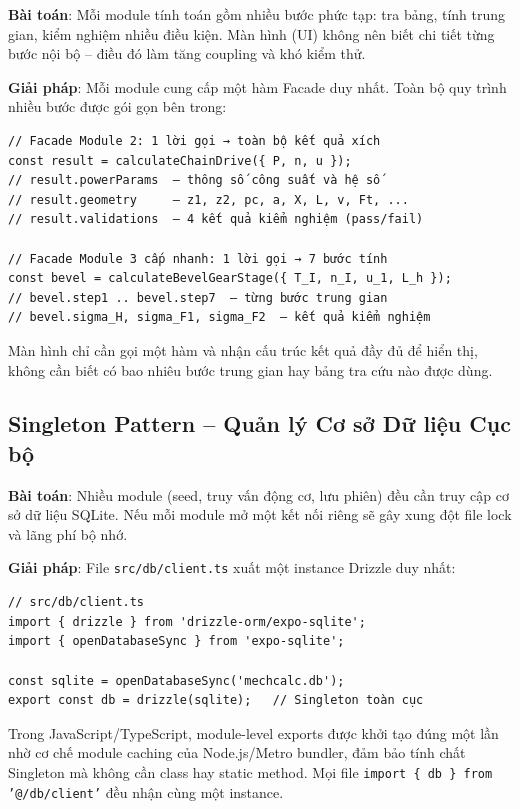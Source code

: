\textbf{Bài toán}: Mỗi module tính toán gồm nhiều bước phức tạp:
tra bảng, tính trung gian, kiểm nghiệm nhiều điều kiện.
Màn hình (UI) không nên biết chi tiết từng bước nội bộ
-- điều đó làm tăng coupling và khó kiểm thử.

\textbf{Giải pháp}: Mỗi module cung cấp một hàm Facade duy nhất.
Toàn bộ quy trình nhiều bước được gói gọn bên trong:

\begin{verbatim}
// Facade Module 2: 1 lời gọi → toàn bộ kết quả xích
const result = calculateChainDrive({ P, n, u });
// result.powerParams  — thông số công suất và hệ số
// result.geometry     — z1, z2, pc, a, X, L, v, Ft, ...
// result.validations  — 4 kết quả kiểm nghiệm (pass/fail)

// Facade Module 3 cấp nhanh: 1 lời gọi → 7 bước tính
const bevel = calculateBevelGearStage({ T_I, n_I, u_1, L_h });
// bevel.step1 .. bevel.step7  — từng bước trung gian
// bevel.sigma_H, sigma_F1, sigma_F2  — kết quả kiểm nghiệm
\end{verbatim}

Màn hình chỉ cần gọi một hàm và nhận cấu trúc kết quả đầy đủ để hiển thị,
không cần biết có bao nhiêu bước trung gian hay bảng tra cứu nào được dùng.

\subsection{Singleton Pattern -- Quản lý Cơ sở Dữ liệu Cục bộ}

\textbf{Bài toán}: Nhiều module (seed, truy vấn động cơ, lưu phiên)
đều cần truy cập cơ sở dữ liệu SQLite.
Nếu mỗi module mở một kết nối riêng sẽ gây xung đột file lock và lãng phí bộ nhớ.

\textbf{Giải pháp}: File \texttt{src/db/client.ts} xuất một instance Drizzle duy nhất:

\begin{verbatim}
// src/db/client.ts
import { drizzle } from 'drizzle-orm/expo-sqlite';
import { openDatabaseSync } from 'expo-sqlite';

const sqlite = openDatabaseSync('mechcalc.db');
export const db = drizzle(sqlite);   // Singleton toàn cục
\end{verbatim}

Trong JavaScript/TypeScript, module-level exports được khởi tạo đúng một lần
nhờ cơ chế module caching của Node.js/Metro bundler,
đảm bảo tính chất Singleton mà không cần class hay static method.
Mọi file \texttt{import \{ db \} from '@/db/client'} đều nhận cùng một instance.

